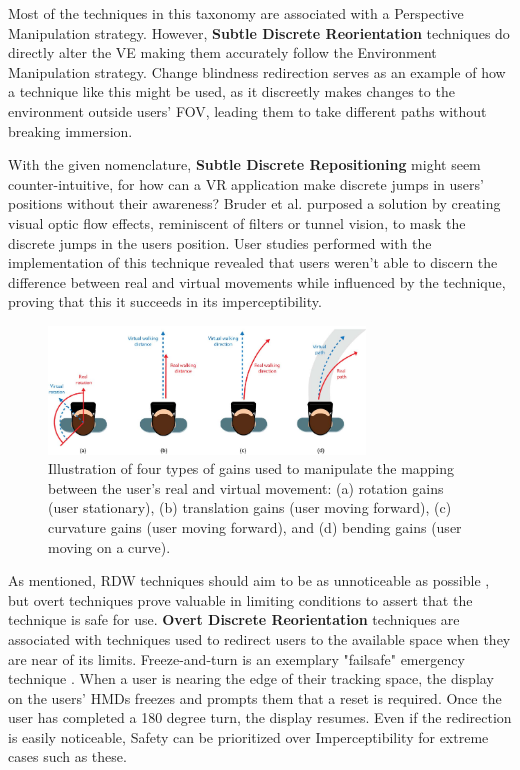 Most of the techniques in this taxonomy are associated with a Perspective Manipulation strategy. However, 
\textbf{Subtle Discrete Reorientation} techniques do directly alter the \gls{VE} making them accurately follow the
Environment Manipulation strategy. Change blindness redirection \cite{5759455} serves as an example of how a technique 
like this might be used, as it discreetly makes changes to the environment outside users' \gls{FOV}, leading them to take different 
paths without breaking immersion.

With the given nomenclature, \textbf{Subtle Discrete Repositioning} might seem counter-intuitive, for how can a \gls{VR} application 
make discrete jumps in users' positions without their awareness? Bruder et al. \cite{Bruder2011} purposed a solution by creating visual 
optic flow effects, reminiscent of filters or tunnel vision, to mask the discrete jumps in the users position. User studies performed 
with the implementation of this technique revealed that users weren't able to discern the difference between real and virtual movements 
while influenced by the technique, proving that this it succeeds in its imperceptibility.

\begin{figure}[t]
    \centering
    \includegraphics[width=0.75\textwidth]{NOVAthesisFiles/Images/papers/rdw-gains.png}
    \caption{  Illustration of four types of gains used to manipulate the mapping between the user’s real
    and virtual movement: (a) rotation gains (user stationary), (b) translation gains (user moving
    forward), (c) curvature gains (user moving forward), and (d) bending gains (user moving on a
    curve). \cite{8255772}}
    \label{fig:rdw-gains}
\end{figure}

As mentioned, \gls{RDW} techniques should aim to be as unnoticeable as possible \cite{8255772}, but overt techniques prove valuable in 
limiting conditions to assert that the technique is safe for use. \textbf{Overt Discrete Reorientation} techniques are associated with 
techniques used to redirect users to the available space when they are near of its limits. Freeze-and-turn is an exemplary 
"failsafe" emergency technique \cite{Williams2007} . When a user is nearing the edge of 
their tracking space, the display on the users' \glspl{HMD} freezes and prompts them that 
a reset is required. Once the user has completed a 180 
degree turn, the display resumes. Even if the redirection is easily noticeable, Safety can be prioritized over 
Imperceptibility for extreme cases such as these.


